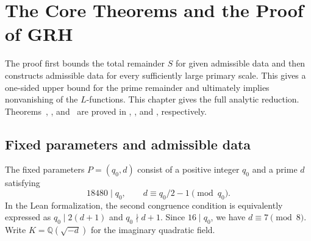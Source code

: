 \chapter{The Core Theorems and the Proof of GRH}
\label{chap:reduction}

\begin{chapterguide}
The proof first bounds the total remainder $S$ for given admissible data and then constructs admissible data for every sufficiently large primary scale. This gives a one-sided upper bound for the prime remainder and ultimately implies nonvanishing of the $L$-functions. This chapter gives the full analytic reduction. Theorems~, , and~ are proved in , , and , respectively.
\end{chapterguide}

\section{Fixed parameters and admissible data}
\label{sec:admissible-data}

\begin{definition}
\label{def:parameters}
\emitthmsource
The fixed parameters $P=(q_0,d)$ consist of a positive integer $q_0$ and a prime $d$ satisfying
\begin{equation}
 18480\mid q_0,\qquad d\equiv q_0/2-1\pmod{q_0}.
\label{eq:fixed-parameters}
\end{equation}
In the Lean formalization, the second congruence condition is equivalently expressed as $q_0\mid 2(d+1)$ and $q_0\nmid d+1$.
Since $16\mid q_0$, we have $d\equiv7\pmod8$. Write $K=\mathbb Q(\sqrt{-d})$ for the imaginary quadratic field.
\end{definition}

